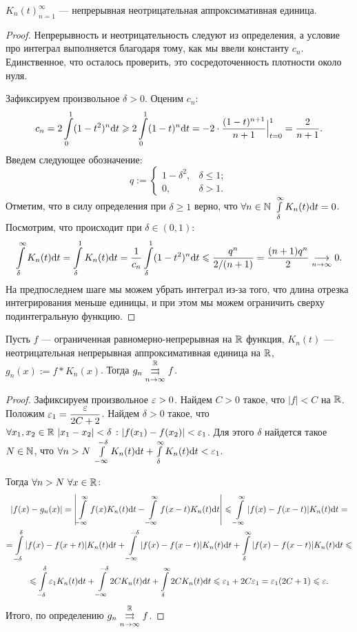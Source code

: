 \begin{Lemma}\label{lemma1}
${K_n(t)}_{n = 1}^{\infty}$ --- непрерывная неотрицательная аппроксимативная единица.
\end{Lemma}
\begin{proof}
Непрерывность и неотрицательность следуют из определения, а условие про интеграл выполняется благодаря тому, как мы ввели константу $c_n$. Единственное, что осталось проверить, это сосредоточенность плотности около нуля.

Зафиксируем произвольное $\delta > 0$. Оценим $c_n$:
$$
c_n = 2 \int\limits_{0}^{1}(1 - t^2)^n \mathrm{d} t \geqslant 2 \int\limits_{0}^{1}(1 - t)^n\mathrm{d} t = -2 \cdot\dfrac{(1 - t)^{n + 1}}{n+1}\Big|_{t=0}^{1} = \dfrac{2}{n + 1}.
$$
Введем следующее обозначение:
$$
q := \begin{cases}
1 - \delta^2, & \delta \leq 1;\\
0, & \delta > 1.
\end{cases}
$$
Отметим, что в силу определения при $\delta \geq 1$ верно, что $\forall n \in \N \ \int\limits_{\delta}^{\infty}K_n(t)\d t = 0$. Посмотрим, что происходит при $\delta \in (0, 1)$:
$$
\int\limits_{\delta}^{\infty}K_n(t)\mathrm{d} t = \int\limits_{\delta}^1 K_n(t)\mathrm{d} t = \dfrac{1}{c_n}\int\limits_{\delta}^{1}(1 - t^2)^n \mathrm{d} t \leqslant \dfrac{q^n}{2/(n + 1)} = \dfrac{(n + 1)q^n}{2} \underset{n\to \infty}{\longrightarrow} 0.
$$
На предпоследнем шаге мы можем убрать интеграл из-за того, что длина отрезка интегрирования меньше единицы, и при этом мы можем ограничить сверху подинтегральную функцию.
\end{proof}

\begin{Lemma}
Пусть $f$ --- ограниченная равномерно-непрерывная на $\mathbb{R}$ функция, $K_n(t)$ --- неотрицательная непрерывная аппроксимативная единица на $\mathbb{R}$, $g_n(x):= f * K_n(x)$. Тогда $g_n \overset{\mathbb{R}}{\underset{n \to \infty}{\rightrightarrows}} f$.
\end{Lemma}
\begin{proof}
Зафиксируем произвольное $\varepsilon > 0$. Найдем $C > 0$ такое, что $|f| < C$ на $\mathbb{R}$. Положим $\varepsilon_1 = \dfrac{\varepsilon}{2C + 2}$. Найдем $\delta > 0$ такое, что $\forall x_1, x_2 \in \mathbb{R}\  |x_1 - x_2| < \delta \ \colon |f(x_1) - f(x_2)| < \varepsilon_1$. Для этого $\delta$ найдется такое $N \in \mathbb{N}$, что $\forall n > N\ \int\limits_{-\infty}^{-\delta}K_n(t)\d t + \int\limits_{\delta}^{\infty}K_n(t) \d t < \eps_1$.

Тогда $\forall n > N\ \forall x \in \mathbb{R}$:
\begin{gather*}
|f(x) - g_n(x)| = \left| \int\limits_{-\infty}^{\infty}f(x)K_n(t)\mathrm{d} t - \int\limits_{-\infty}^{\infty}f(x - t)K_n(t)\mathrm{d} t \right| \leqslant \int\limits_{-\infty}^{\infty}|f(x) - f(x - t)|K_n(t)\mathrm{d} t = \\
= \int\limits_{-\delta}^{\delta}|f(x) - f(x + t)| K_n(t)\mathrm{d} t + \int\limits_{-\infty}^{-\delta} |f(x) - f(x - t)|K_n(t)\mathrm{d} t + \int\limits_{\delta}^{\infty} |f(x) - f(x - t)|K_n(t)\mathrm{d} t \leqslant \\
\leqslant \int\limits_{-\delta}^{\delta}\varepsilon_1 K_n(t)\mathrm{d} t + \int\limits_{-\infty}^{-\delta}2C K_n(t) \mathrm{d} t + \int\limits_{\delta}^{\infty}2C K_n(t) \mathrm{d} t \leqslant \varepsilon_1 + 2C\varepsilon_1 = \varepsilon_1(2C + 1) \leqslant \varepsilon.
\end{gather*}
Итого, по определению $g_n \overset{\mathbb{R}}{\underset{n \to \infty}{\rightrightarrows}} f$.
\end{proof}

